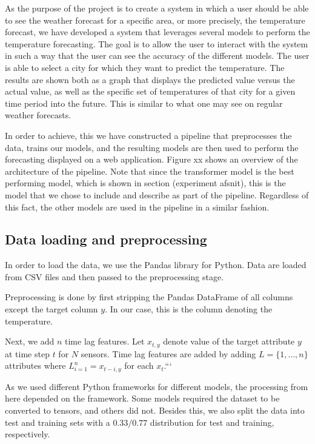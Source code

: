 As the purpose of the project is to create a system in which a user should be able to see the weather forecast for a specific area, or more precisely, the temperature forecast, we have developed a system that leverages several models to perform the temperature forecasting. 
The goal is to allow the user to interact with the system in such a way that the user can see the accuracy of the different models. 
The user is able to select a city for which they want to predict the temperature. The results are shown both as a graph that displays the predicted value versus the actual value, as well as the specific set of temperatures of that city for a given time period into the future. This is similar to what one may see on regular weather forecasts.

In order to achieve, this we have constructed a pipeline that preprocesses the data, trains our models, and the resulting models are then used to perform the forecasting displayed on a web application. 
Figure xx shows an overview of the architecture of the pipeline.
Note that since the transformer model is the best performing model, which is shown in section (experiment afsnit), this is the model that we chose to include and describe as part of the pipeline. Regardless of this fact, the other models are used in the pipeline in a similar fashion.

\subsection{Data loading and preprocessing}
In order to load the data, we use the Pandas library for Python.
Data are loaded from CSV files and then passed to the preprocessing stage.

Preprocessing is done by first stripping the Pandas DataFrame of all columns except the target column $y$. In our case, this is the column denoting the temperature.

Next, we add $n$ time lag features. Let $x_{t,y}$ denote value of the target attribute $y$ at time step $t$ for $N$ sensors. 
Time lag features are added by adding $L=\{1,\dots, n\}$ attributes where $L_{i=1}^n=x_{t-i, y}$ for each $x_{t}$.```

As we used different Python frameworks for different models, the processing from here depended on the framework. Some models required the dataset to be converted to tensors, and others did not.
Besides this, we also split the data into test and training sets with a $0.33/0.77$ distribution for test and training, respectively.

